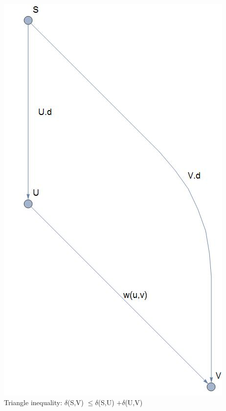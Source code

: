 \documentclass[12pt]{article}
\begin{document}
\includegraphics[scale = 0.35]{graph.jpg}\\
Triangle inequality: $\delta$(S,V) $\leq \delta$(S,U) $+ \delta$(U,V)
\newpage
\end{document}
